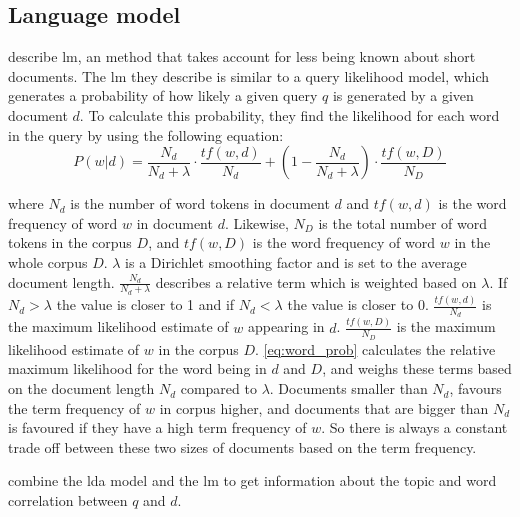 \subsection{Language model}\label{sec:lm}
\citet{yang2009topic} describe \gls{lm}, an  method that takes account for less being known about short documents.
The \acrlong{lm} they describe is similar to a query likelihood model, which generates a probability of how likely a given query $q$ is generated by a given document $d$.
To calculate this probability, they find the likelihood for each word in the query by using the following equation:
\begin{equation}\label{eq:word_prob}
	P(w|d) = \frac{N_d}{N_d + \lambda} \cdot \frac{tf(w,d)}{N_d} + (1 - \frac{N_d}{N_d + \lambda}) \cdot \frac{tf(w,D)}{N_D}
\end{equation}

where $N_d$ is the number of word tokens in document $d$ and $tf(w,d)$ is the word frequency of word $w$ in document $d$.
Likewise, $N_D$ is the total number of word tokens in the corpus $D$, and $tf(w,D)$ is the word frequency of word $w$ in the whole corpus $D$.
$\lambda$ is a Dirichlet smoothing factor and is set to the average document length.
$ \frac{N_d}{N_d + \lambda} $ describes a relative term which is weighted based on $ \lambda $. If $N_d > \lambda$ the value is closer to 1 and if $ N_d < \lambda $ the value is closer to 0.
$\frac{tf(w,d)}{N_d}$ is the maximum likelihood estimate of $w$ appearing in $d$.
$\frac{tf(w,D)}{N_D}$ is the maximum likelihood estimate of $w$ in the corpus $D$.
\autoref{eq:word_prob} calculates the relative maximum likelihood for the word being in $ d $ and $ D $, and weighs these terms based on the document length $N_d$ compared to $\lambda$.
Documents smaller than $N_d$, favours the term frequency of $w$ in corpus higher, and documents that are bigger than $N_d$ is favoured if they have a high term frequency of $w$.
So there is always a constant trade off between these two sizes of documents based on the term frequency.

\cite{yang2009topic} combine the \gls{lda} model and the \gls{lm} to get information about the topic and word correlation between $q$ and $d$.
